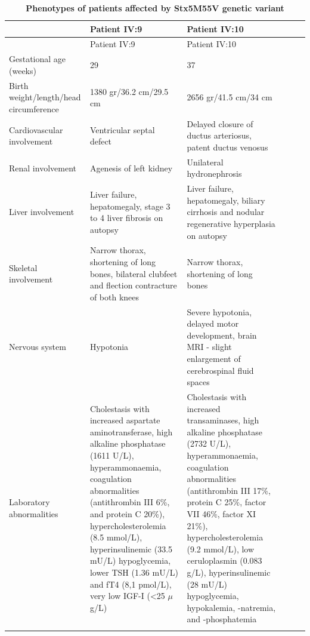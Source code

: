 \footnotesize
\begin{longtable}[c]{C{3cm}C{3cm}C{3cm}c c c}
    \caption{\textbf{Phenotypes of patients affected by Stx5M55V genetic variant}}                                    \\
                          & Patient IV:9                      & Patient IV:10                              \\
    \hline
    \endfirsthead
& Patient IV:9                      & Patient IV:10                              \\
    \hline
    \endhead
    Gestational age (weeks)      & 29           & 37                        \\
    \hline
    Birth weight/length/head circumference              & 1380 gr/36.2 cm/29.5 cm & 2656 gr/41.5 cm/34 cm     \\
    \hline
    Cardiovascular involvement                   & Ventricular septal defect                     & Delayed closure of ductus arteriosus, patent ductus venosus                                       \\
    \hline
    Renal involvement          & Agenesis of left kidney     & Unilateral hydronephrosis                    \\
    \hline
    Liver involvement                   & Liver failure, hepatomegaly, stage 3 to 4 liver fibrosis on autopsy                     & Liver failure, hepatomegaly, biliary cirrhosis and nodular regenerative hyperplasia on autopsy      \\
    \hline
    Skeletal involvement                  & Narrow thorax, shortening of long bones, bilateral clubfeet and flection contracture of both knees                      & Narrow thorax, shortening of long bones                         \\
    \hline
    Nervous system                 & Hypotonia                     & Severe hypotonia, delayed motor development, brain MRI - slight enlargement of cerebrospinal fluid spaces                        \\
    \hline
    Laboratory abnormalities        & Cholestasis with increased aspartate aminotransferase, high alkaline phosphatase (1611 U/L), hyperammonaemia, coagulation abnormalities (antithrombin III 6\%, and protein C 20\%), hypercholesterolemia (8.5 mmol/L), hyperinsulinemic (33.5 mU/L) hypoglycemia, lower TSH (1.36 mU/L) and fT4 (8,1 pmol/L), very low IGF-I (<25 $\mu$g/L)                   & Cholestasis with increased transaminases, high alkaline phosphatase (2732 U/L), hyperammonaemia, coagulation abnormalities (antithrombin III 17\%, protein C 25\%, factor VII 46\%, factor XI 21\%), hypercholesterolemia (9.2 mmol/L),  low ceruloplasmin (0.083 g/L), hyperinsulinemic (28 mU/L) hypoglycemia, hypokalemia, -natremia, and -phosphatemia                       \\
    \hline
    \label{tbl:ch6tbl1}
\end{longtable}
\normalsize

